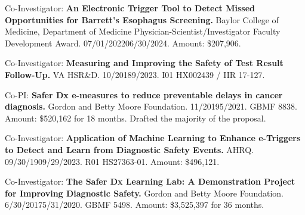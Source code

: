 \documentclass[10pt]{article}
\begin{document}





Co-Investigator: \textbf{An Electronic Trigger Tool to Detect Missed
  Opportunities for Barrett’s Esophagus Screening.} Baylor College of
Medicine, Department of Medicine Physician-Scientist/Investigator
Faculty Development Award. 07/01/2022\ndash{}06/30/2024. Amount:
\$207,906.

Co-Investigator: \textbf{Measuring and Improving the Safety of Test
  Result Follow-Up.} VA HSR\&D. 10/2018\ndash{}9/2023. I01 HX002439 /
IIR 17-127.

Co-PI: \textbf{Safer Dx e-measures to reduce preventable delays in
  cancer diagnosis.} Gordon and Betty Moore Foundation.
11/2019\ndash{}5/2021. GBMF 8838. Amount: \$520,162 for 18 months.
Drafted the majority of the proposal.

Co-Investigator: \textbf{Application of Machine Learning to Enhance
  e-Triggers to Detect and Learn from Diagnostic Safety Events.} AHRQ.
09/30/19\ndash{}09/29/2023. R01 HS27363-01. Amount: \$496,121.

Co-Investigator: \textbf{The Safer Dx Learning Lab: A Demonstration
  Project for Improving Diagnostic Safety.} Gordon and Betty Moore
Foundation. 6/30/2017\ndash{}5/31/2020. GBMF 5498. Amount: \$3,525,397
for 36 months.
\end{document}
